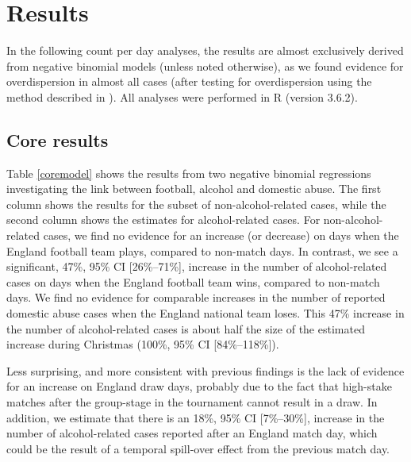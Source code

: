 \documentclass[12pt, a4paper]{article}
\begin{document}
\newpage

\section{Results}

In the following count per day analyses, the results are almost exclusively derived from negative binomial models (unless noted otherwise), as we found evidence for overdispersion in almost all cases (after testing for overdispersion using the method described in ). All analyses were performed in R (version 3.6.2).


\subsection{Core results} 

Table \ref{coremodel} shows the results from two negative binomial regressions investigating the link between football, alcohol and domestic abuse. The first column shows the results for the subset of non-alcohol-related cases, while the second column shows the estimates for alcohol-related cases. For non-alcohol-related cases, we find no evidence for an increase (or decrease) on days when the England football team plays, compared to non-match days. In contrast, we see a significant, 47\%, 95\% CI [26\%--71\%], increase in the number of alcohol-related cases on days when the England football team wins, compared to non-match days. We find no evidence for comparable increases in the number of reported domestic abuse cases when the England national team loses. This 47\% increase in the number of alcohol-related cases is about half the size of the estimated increase during Christmas (100\%, 95\% CI [84\%--118\%]).


Less surprising, and more consistent with previous findings is the lack of evidence for an increase on England draw days, probably due to the fact that high-stake matches after the group-stage in the tournament cannot result in a draw. In addition, we estimate that there is an 18\%, 95\% CI [7\%--30\%], increase in the number of alcohol-related cases reported after an England match day, which could be the result of a temporal spill-over effect from the previous match day. 
\end{document}
